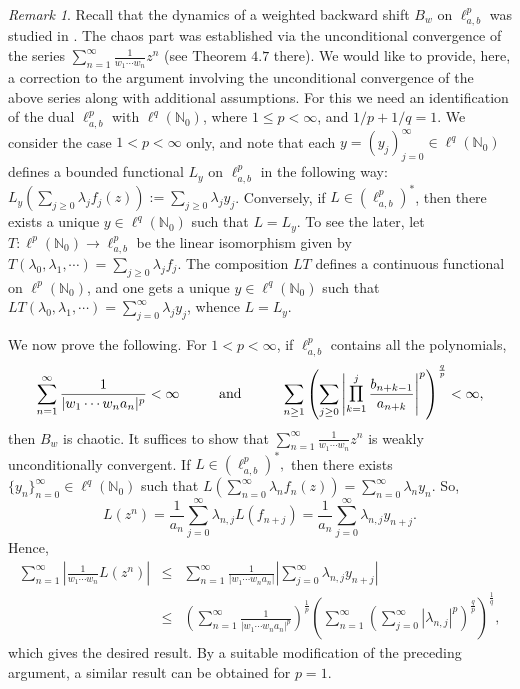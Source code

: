 \documentclass[12pt, reqno]{amsart}
\DeclareMathOperator*{\Mprod}{\text{\raisebox{0.25ex}{\scalebox{0.8}{$\prod$}}}}
\theoremstyle{definition}
\theoremstyle{remark}
\newtheorem{remark}[theorem]{Remark}
\numberwithin{equation}{section}
\begin{document}
\begin{remark}
Recall that the dynamics of a weighted backward shift $B_w$ on $\ell^p_{a,b}$ was studied in \cite{Das-Mundayadan}. The chaos part was established via the unconditional convergence of the series $\sum_{n=1}^{\infty}\frac{1}{w_1\cdots w_n}z^n$ (see Theorem $4.7$ there). We would like to provide, here, a correction to the argument involving the unconditional convergence of the above series along with additional assumptions. For this we need an identification of the dual $\ell^p_{a,b}$ with $\ell^q(\mathbb{N}_0)$, where $1\leq p<\infty$, and $1/p+1/q=1$. We consider the case $1<p<\infty$ only, and note that each $y=(y_j)_{j=0}^{\infty}\in \ell^{q}(\mathbb{N}_0)$ defines a bounded functional $L_y$ on $\ell^p_{a,b}$ in the following way: $L_y(\sum_{j\geq 0} \lambda_j f_j(z)):=\sum_{j\geq 0}\lambda_j y_j$. Conversely, if $L\in (\ell^p_{a,b})^*$, then there exists a unique $y\in \ell^q(\mathbb{N}_0)$ such that $L=L_y$. To see the later, let $T:\ell^p(\mathbb{N}_0)\rightarrow \ell^p_{a,b}$ be the linear isomorphism given by $T(\lambda_0,\lambda_1,\cdots)=\sum_{j\geq 0} \lambda_j f_j$. The composition $LT$ defines a continuous functional on $\ell^p(\mathbb{N}_0)$, and one gets a unique 
$y\in \ell^q(\mathbb{N}_0)$ such that $LT(\lambda_0,\lambda_1,\cdots)=\sum_{j=0}^{\infty} \lambda_j y_j$, whence $L=L_y$.




We now prove the following. For $1<p<\infty$, if $\ell^p_{a,b}$ contains all the polynomials, 
\[
\sum_{n=1}^{\infty}\frac{1}{|w_{1}\cdots w_{n}a_{n}|^{p}}<\infty\hspace{1cm}\text{and}\hspace{1cm} \sum_{n\geq 1}\left(\sum_{j\geq 0}\left\lvert \Mprod_{k=1}^{j}\frac{b_{n+k-1}}{ a_{n+k}}\right\rvert^{p}\right)^{\frac{q}{p}}<\infty,
\]
then $B_w$ is chaotic. It suffices to show that $\sum_{n=1}^{\infty}\frac{1}{w_{1}\cdots w_{n}}z^{n}$ is weakly unconditionally convergent. If $L\in (\ell^{p}_{a,b})^{*},$ then there exists $\{y_{n}\}_{n=0}^{\infty}\in \ell^{q}(\mathbb{N}_{0})$ such that $L\left(\sum_{n=0}^{\infty}\lambda_{n}f_{n}(z)\right)=\sum_{n=0}^{\infty}\lambda_{n}y_{n}.$ So,
\[
L(z^{n})=\frac{1}{a_{n}}\sum_{j=0}^{\infty}\lambda_{n,j}L(f_{n+j})=\frac{1}{a_{n}}\sum_{j=0}^{\infty}\lambda_{n,j}y_{n+j}.
\]
Hence,
\begin{eqnarray*}
    \sum_{n=1}^{\infty}\left\lvert\frac{1}{w_1\cdots w_n}L(z^n)\right\rvert&\leq& \sum_{n=1}^{\infty}\frac{1}{|w_{1}\cdots w_{n}a_{n}|}\left\lvert\sum_{j=0}^{\infty}\lambda_{n,j}y_{n+j}\right\rvert\\
    &\leq&\left(\sum_{n=1}^{\infty}\frac{1}{|w_{1}\cdots w_{n}a_{n}|^{p}}\right)^{\frac{1}{p}}\left(\sum_{n=1}^{\infty}\left(\sum_{j=0}^{\infty}|\lambda_{n,j}|^p\right)^{\frac{q}{p}}\right)^{\frac{1}{q}},
\end{eqnarray*}
which gives the desired result. By a suitable modification of the preceding argument, a similar result can be obtained for $p=1$.

\end{remark}
\end{document}
